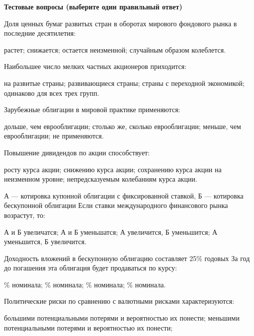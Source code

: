 \documentclass[12pt, table]{exam}
\begin{document}
\pagebreak
\noindent\textbf{Тестовые вопросы (выберите один правильный ответ)}

\begin{questions}
\begin{multicols}{2}
\setlength{\columnsep}{1cm}

\question  Доля ценных бумаг развитых стран в оборотах мирового фондового рынка в последние десятилетия:
	 \begin{choices}
	 \choice растет;
	 \CC снижается;
	 \choice остается неизменной;
	 \choice случайным образом колеблется.
	 \end{choices}
\question  Наибольшее число мелких частных акционеров приходится:
	 \begin{choices}
	 \CC на развитые страны;
	 \choice развивающиеся страны;
	 \choice страны с переходной экономикой;
	 \choice одинаково для всех трех групп.
	 \end{choices}
\question  Зарубежные облигации в мировой практике применяются:
	 \begin{choices}
	 \CC дольше, чем еврооблигации;
	 \choice столько же, сколько еврооблигации;
	 \choice меньше, чем еврооблигации;
	 \choice не применяются.
	 \end{choices}
\question  Повышение дивидендов по акции способствует:
	 \begin{choices}
	 \CC росту курса акции;
	 \choice снижению курса акции;
	 \choice сохранению курса акции на неизменном уровне;
	 \choice непредсказуемым колебаниям курса акции.
	 \end{choices}
\question  А — котировка купонной облигации с фиксированной ставкой, Б — котировка бескупонной облигации Если ставки международного финансового рынка возрастут, то:
	 \begin{choices}
	 \choice А и Б увеличатся;
	 \CC А и Б уменьшатся;
	 \choice А увеличится, Б уменьшится;
	 \choice А уменьшится, Б увеличится.
	 \end{choices}
\question  Доходность вложений в бескупонную облигацию составляет 25\% годовых За год до погашения эта облигация будет продаваться по курсу:
	 \begin{choices}
	 \% номинала;
	 \% номинала;
	 \% номинала;
	 \% номинала.
	 \end{choices}
\question  Политические риски по сравнению с валютными рисками характеризуются:
	 \begin{choices}
	 \choice большими потенциальными потерями и вероятностью их понести;
	 \choice меньшими потенциальными потерями и вероятностью их понести;

\end{choices}
\end{multicols}
\end{questions}
\end{document}

